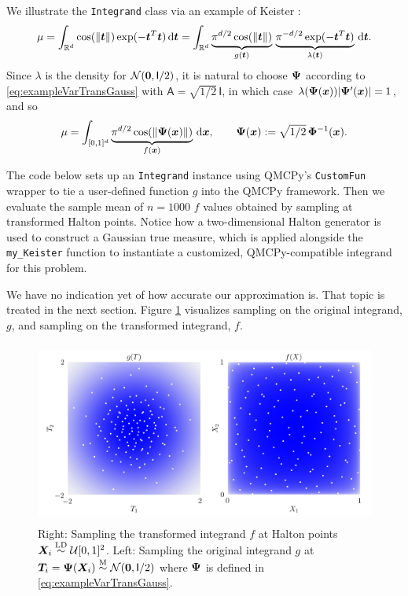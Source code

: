 \documentclass[graybox,footinfo]{svmult}
\newcommand{\QMCPYabs}[1]{\ensuremath{{\left \lvert #1 \right \rvert}}}
\newcommand{\LD}{\textup{LD}}
\newcommand{\LDsim}{\overset{\LD}{\sim}}
\newcommand{\Msim}{\overset{\textup{M}}{\sim}}
\newcommand{\mA}{\mathsf{A}}
\newcommand{\mI}{\mathsf{I}}
\begin{document}
We illustrate the \texttt{Integrand} class via an example of Keister \cite{Kei96}:
\begin{equation} \label{eq:KeisterIntegral}
	\mu 
	= \int_{\bbR^d} \cos(\lVert \bst \rVert) \exp(-\bst^T \bst) \, \D \bst \\ 
	= \int_{\bbR^d} \underbrace{\pi^{d/2} \cos(\lVert \bst \rVert)}_{g(\bst)}\, \underbrace{\pi^{-d/2} \exp(-\bst^T \bst) }_{\lambda(\bst)} \, \D \bst.
\end{equation}
Since $\lambda$ is the density for $\calN(\bszero,\mI/2)$, it is natural to choose ${\boldsymbol{\Psi}}$ according to \eqref{eq:exampleVarTransGauss} with $\mA = \sqrt{1/2} \, \mI$, in which case $\lambda(\bsPsi(\bsx)) \QMCPYabs{\bsPsi'(\bsx)}  = 1$, and so 
\[
\mu = \int_{[0,1]^d} \underbrace{\pi^{d/2} \cos(\lVert {\boldsymbol{\Psi}}({\boldsymbol{x}}) \rVert)}_{f({\boldsymbol{x}})} \, \mathrm{d} {\boldsymbol{x}}, \qquad 
{\boldsymbol{\Psi}}({\boldsymbol{x}}) := \sqrt{1/2} \,{\boldsymbol{\Phi}}^{-1}({\boldsymbol{x}}).
\]

The code below sets up an \texttt{Integrand} instance using QMCPy's \texttt{CustomFun} wrapper to tie a user-defined function $g$ into the QMCPy framework.  Then we evaluate the sample mean of $n=1000$ $f$ values obtained by sampling at transformed Halton points. Notice how a two-dimensional Halton generator is used to construct a Gaussian true measure, which is applied alongside the \texttt{my\_Keister} function to instantiate a customized, QMCPy-compatible integrand for this problem.

We have no indication yet of how accurate our approximation is.  That topic is treated in the next section.  Figure \ref{fig:ikc} visualizes sampling on the original integrand, $g$, and sampling on the transformed integrand, $f$. 

\begin{figure}[t]
	\includegraphics[height=6cm]{QMCSoftwareArticle/figs/i_keister_contours.png}
	\caption{Right: Sampling the transformed integrand $f$ at Halton points $\bsX_i \LDsim \calU[0,1]^2$. Left: Sampling the original integrand $g$ at $\bsT_i = \bsPsi(\bsX_i) \Msim \calN(\bszero,\mI/2)$ where ${\boldsymbol{\Psi}}$ is defined in \eqref{eq:exampleVarTransGauss}.  } \label{fig:ikc}
\end{figure}
\end{document}

